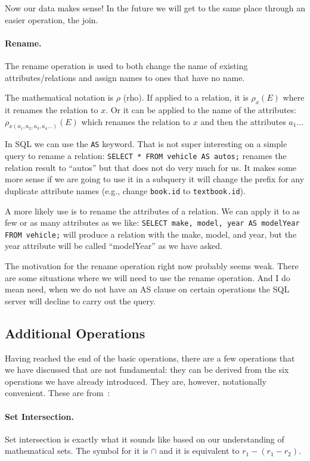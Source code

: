 \documentclass[a4paper]{report}
\begin{document}
Now our data makes sense! In the future we will get to the same place through an easier operation, the join.

\paragraph{Rename.} The rename operation is used to both change the name of existing attributes/relations and assign names to ones that have no name. 

The mathematical notation is $\rho$ (rho). If applied to a relation, it is $\rho_{x}(E)$ where it renames the relation to $x$. Or it can be applied to the name of the attributes: $\rho_{x(a_{1}, a_{2}, a_{3}, a_{4}...)}(E)$ which renames the relation to $x$ and then the attributes $a_{1}$...

In SQL we can use the \texttt{AS} keyword. That is not super interesting on a simple query to rename a relation: \texttt{SELECT * FROM vehicle AS autos;} renames the relation result to ``autos'' but that does not do very much for us. It makes some more sense if we are going to use it in a subquery it will change the prefix for any duplicate attribute names (e.g., change \texttt{book.id} to \texttt{textbook.id}). 

A more likely use is to rename the attributes of a relation. We can apply it to as few or as many attributes as we like: \texttt{SELECT make, model, year AS modelYear FROM vehicle;} will produce a relation with the make, model, and year, but the year attribute will be called ``modelYear'' as we have asked.

The motivation for the rename operation right now probably seems weak. There are some situations where we will need to use the rename operation. And I do mean need, when we do not have an AS clause on certain operations the SQL server will decline to carry out the query.

\subsection*{Additional Operations}
Having reached the end of the basic operations, there are a few operations that we have discussed that are not fundamental: they can be derived from the six operations we have already introduced. They are, however, notationally convenient. These are from~\cite{dsc}:

\paragraph{Set Intersection.} Set intersection is exactly what it sounds like based on our understanding of mathematical sets. The symbol for it is $\cap$ and it is equivalent to $r_{1} - (r_{1} - r_{2})$.
\end{document}
